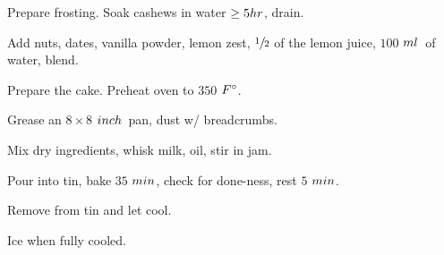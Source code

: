\begin{preparation}
\item Prepare frosting.
    Soak cashews in water $\ge5\hour$, drain.
\item Add nuts, dates, vanilla powder, lemon zest, $\onehalf$ of the lemon
    juice, $100$ $\ml$~of water, blend.
\item Prepare the cake.
    Preheat oven to $350$ $\Fahrenheit$.
\item Grease an $8\times8$ $\inch$~pan, dust w/ breadcrumbs.
\item Mix dry ingredients, whisk milk, oil, stir in jam.
\item Pour into tin, bake $35$ $\minute$, check for done-ness, rest $5$ $\minute$.
\item Remove from tin and let cool.
\item Ice when fully cooled.
\end{preparation}

\recipeend%
